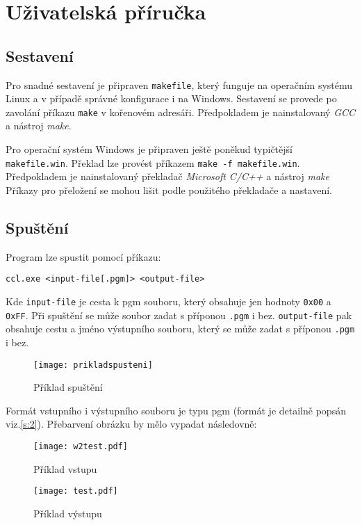 \documentclass[12pt, a4paper]{article}
\begin{document}
\section{Uživatelská příručka}

\subsection{Sestavení}
Pro snadné sestavení je připraven \texttt{makefile}, který funguje na operačním systému Linux a v případě správné konfigurace i na Windows. Sestavení se provede po zavolání příkazu \texttt{make} v kořenovém adresáři. Předpokladem je nainstalovaný {\it GCC} a nástroj {\it make}. 

Pro operační systém Windows je připraven ještě poněkud typičtější \texttt{makefile.win}. Překlad lze provést příkazem \texttt{make -f makefile.win}. Předpokladem je nainstalovaný překladač {\it Microsoft C/C++} a nástroj {\it make} Příkazy pro přeložení se mohou lišit podle použitého překladače a nastavení.

\subsection{Spuštění}
Program lze spustit pomocí příkazu:

\vspace{0.5cm}
\centerline{ \texttt{ccl.exe <input-file[.pgm]> <output-file>}}
\vspace{0.5cm}

\noindent Kde \texttt{input-file} je cesta k pgm souboru, který obsahuje jen hodnoty \texttt{0x00} a \texttt{0xFF}. Při spuštění se může soubor zadat s příponou \texttt{.pgm} i bez. \texttt{output-file} pak obsahuje cestu a jméno výstupního souboru, který se může zadat s příponou \texttt{.pgm} i bez. 
\begin{figure}[h]
\centering 
\texttt{[image: prikladspusteni]}
\caption{Příklad spuštění}
\end{figure}

Formát vstupního i výstupního souboru je typu pgm (formát je detailně popsán viz.\ref{s:2}). Přebarvení obrázku by mělo vypadat následovně:
\begin{figure}[h]
  \centering
  \begin{minipage}[b]{0.45\textwidth}
    \texttt{[image: w2test.pdf]}
    \caption{Příklad vstupu}
  \end{minipage}
  \hfill
  \begin{minipage}[b]{0.45\textwidth}
    \texttt{[image: test.pdf]}
    \caption{Příklad výstupu}
  \end{minipage}
\end{figure}
\end{document}
